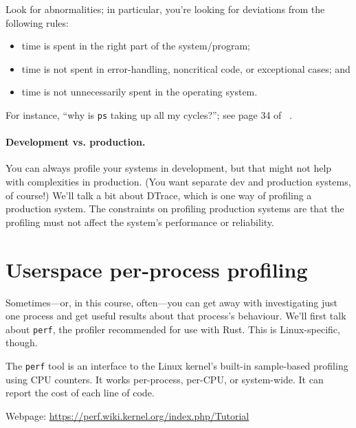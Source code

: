 Look for abnormalities; in particular, you're looking for
deviations from the following rules:
\begin{itemize}[noitemsep]
\item time is spent in the right part of the system/program;
\item time is not spent in error-handling, noncritical code, or exceptional cases; and
\item time is not unnecessarily spent in the operating system.
\end{itemize}
For instance, ``why is {\tt ps} taking up all my cycles?'';
see page 34 of ~\cite{300ps}.

\paragraph{Development vs. production.}
You can always profile your systems in development, but that might not
help with complexities in production. (You want separate dev and
production systems, of course!) We'll talk a bit about DTrace, which
is one way of profiling a production system. The constraints on profiling 
production systems are that the profiling must not affect the system's
performance or reliability.

\section*{Userspace per-process profiling}
Sometimes---or, in this course, often---you can get away with
investigating just one process and get useful results about that
process's behaviour.  We'll first talk about {\tt perf}, the profiler 
recommended for use with Rust. This is Linux-specific, though.

The \texttt{perf} tool is an interface to the Linux kernel's built-in
sample-based profiling using CPU counters. It works per-process, per-CPU, or system-wide. It can report the cost of each line of code.

Webpage: \url{https://perf.wiki.kernel.org/index.php/Tutorial}


